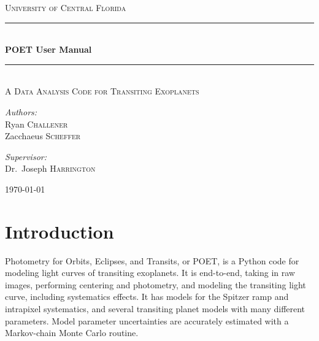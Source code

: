 \documentclass[letterpaper,12pt]{article}
\begin{document}
\begin{titlepage}
\begin{center}

\textsc{\LARGE University of Central Florida}\\[1.5cm]

\rule{\linewidth}{0.5mm} \\[0.4cm]
{ \huge \bfseries POET User Manual \\[0.4cm] }
\rule{\linewidth}{0.5mm} \\[1.0cm]

\textsc{\Large A Data Analysis Code for Transiting Exoplanets}\\[1.5cm]

\noindent
\begin{minipage}{0.4\textwidth}
\begin{flushleft} \large
\emph{Authors:}\\
Ryan      \textsc{Challener} \\
Zacchaeus \textsc{Scheffer}\\ \vspace{1.2cm}
\end{flushleft}
\end{minipage}%
\begin{minipage}{0.4\textwidth}
\begin{flushright} \large
\emph{Supervisor:} \\
Dr.~Joseph \textsc{Harrington}\\ \vspace{1.2cm}
\end{flushright}
\end{minipage}

\vfill

{\large \today}

\end{center}
\end{titlepage}


\section{Introduction}
\label{sec:intro}
Photometry for Orbits, Eclipses, and Transits, or POET, is a Python
code for modeling light curves of transiting exoplanets. It is
end-to-end, taking in raw images, performing centering and photometry,
and modeling the transiting light curve, including systematics
effects.  It has models for the Spitzer ramp and intrapixel
systematics, and several transiting planet models with many different
parameters. Model parameter uncertainties are accurately estimated
with a Markov-chain Monte Carlo routine.
\end{document}
